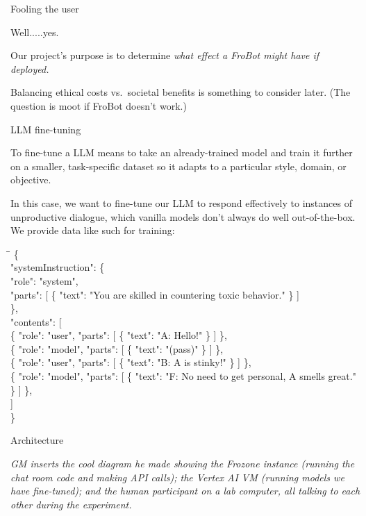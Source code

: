 \documentclass[12pt]{beamer}
\begin{document}
\begin{frame}[c]{Fooling the user}
\pause

Well.....yes.

\pause

Our project's purpose is to determine \textit{what effect a FroBot might have if deployed.}

Balancing ethical costs vs.~societal benefits is something to consider later. (The question is moot if FroBot doesn't work.)

\end{frame}
\begin{frame}[c]{LLM fine-tuning}

To fine-tune a LLM means to take an already-trained model and train it further on a smaller, task-specific dataset so it adapts to a particular style, domain, or objective. 

In this case, we want to fine-tune our LLM to respond effectively to instances of unproductive dialogue, which vanilla models don't always do well out-of-the-box. We provide data like such for training:

\tiny
\ttfamily
\begin{tabbing}
\hspace{1em}\=\hspace{2em}\=\kill %
\{ \\
\> "systemInstruction": \{ \\
\>\> "role": "system", \\
\>\> "parts": [ \{ "text": "You are skilled in countering toxic behavior." \} ] \\
\> \}, \\
\> "contents": [ \\
\>\> \{ "role": "user",  "parts": [ \{ "text": "A: Hello!" \} ] \}, \\
\>\> \{ "role": "model", "parts": [ \{ "text": "(pass)" \} ] \}, \\
\>\> \{ "role": "user",  "parts": [ \{ "text": "B: A is stinky!" \} ] \}, \\
\>\> \{ "role": "model", "parts": [ \{ "text": "F: No need to get personal, A smells great." \} ] \}, \\
\> ] \\
\}
\end{tabbing}

\end{frame}
\begin{frame}[c]{Architecture}

\textit{GM inserts the cool diagram he made showing the Frozone instance (running the chat room code and making API calls); the Vertex AI VM (running models we have fine-tuned); and the human participant on a lab computer, all talking to each other during the experiment.}

\end{frame}
\end{document}

